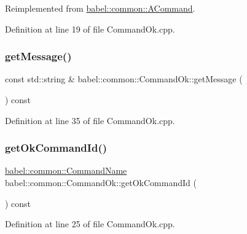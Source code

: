 Reimplemented from \mbox{\hyperlink{classbabel_1_1common_1_1_a_command_a67b110bc98f6c47b0739c6eba9a5432e}{babel\+::common\+::\+A\+Command}}.



Definition at line 19 of file Command\+Ok.\+cpp.

\mbox{\label{classbabel_1_1common_1_1_command_ok_ae70071d00f69cd1ed94ac1d20ec98840}} 
\subsubsection{\texorpdfstring{get\+Message()}{getMessage()}}
{\footnotesize\ttfamily const std\+::string \& babel\+::common\+::\+Command\+Ok\+::get\+Message (\begin{DoxyParamCaption}{ }\end{DoxyParamCaption}) const}



Definition at line 35 of file Command\+Ok.\+cpp.

\mbox{\label{classbabel_1_1common_1_1_command_ok_a730dd943b649f7570b6cb365cd40ddca}} 
\subsubsection{\texorpdfstring{get\+Ok\+Command\+Id()}{getOkCommandId()}}
{\footnotesize\ttfamily \mbox{\hyperlink{namespacebabel_1_1common_a2d31f246c776da6bf656bd71e86cbb2c}{babel\+::common\+::\+Command\+Name}} babel\+::common\+::\+Command\+Ok\+::get\+Ok\+Command\+Id (\begin{DoxyParamCaption}{ }\end{DoxyParamCaption}) const}



Definition at line 25 of file Command\+Ok.\+cpp.

\mbox{\label{classbabel_1_1common_1_1_command_ok_aa3b27ee553ae5c7cde2713c919600210}} 
